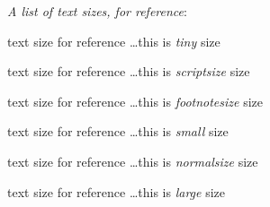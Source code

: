 {\color{blue} \emph{A list of text sizes, for reference}:}

{\tiny text size for reference} \dots this is \emph{tiny} size

{\scriptsize text size for reference} \dots this is \emph{scriptsize} size

{\footnotesize text size for reference} \dots this is \emph{footnotesize} size

{\small text size for reference} \dots this is \emph{small} size

{\normalsize text size for reference} \dots this is \emph{normalsize} size

{\large text size for reference} \dots this is \emph{large} size
